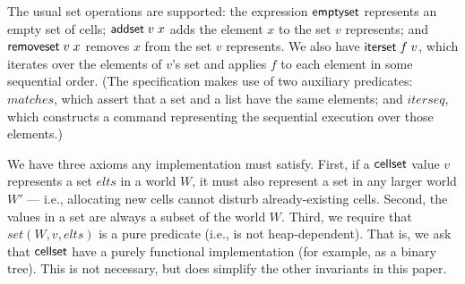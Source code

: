 \documentclass[natbib]{sigplanconf}
\begin{document}
The usual set operations are supported: the expression
$\mbox{\textsf{{emptyset}}}$ represents an empty set of cells; 
$\mbox{\textsf{{addset}}}\;v\;x$ adds the element $x$ to the set $v$
represents; and $\mbox{\textsf{{removeset}}}\;v\;x$ removes $x$ from the
set $v$ represents. We also have $\mbox{\textsf{{iterset}}}\;f\;v$, which
iterates over the elements of $v$'s set and applies $f$ to each
element in some sequential order. (The specification
makes use of two auxiliary predicates: $\mathit{matches}$, which assert that a
set and a list have the same elements; and $\mathit{iterseq}$, which constructs
a command representing the sequential execution over those elements.)

We have three axioms any implementation must satisfy. First, if a
$\mbox{\textsf{{cellset}}}$ value $v$ represents a set $elts$ in a world $W$, it must
also represent a set in any larger world $W'$ --- i.e., allocating
new cells cannot disturb already-existing cells.  Second, the values
in a set are always a subset of the world $W$.  Third, we require
that $set(W,v,elts)$ is a pure predicate (i.e., is not
heap-dependent). That is, we ask that $\mbox{\textsf{{cellset}}}$ have a purely
functional implementation (for example, as a binary tree). This is not
necessary, but does simplify the other invariants in this paper.
\end{document}
